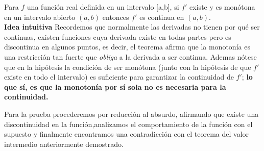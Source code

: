 \begin{teorema}
    Para \(f\) una función real definida en un intervalo [a,b], si $f'$ existe y es monótona en un intervalo abierto $(a, b)$ entonces $f'$ es continua en $(a, b)$.\\
    
    \textbf{Idea intuitiva}  \normalsize
Recordemos que normalmente las derivadas no tienen por qué ser continuas, existen funciones cuya derivada existe en todas partes pero es discontinua en algunos puntos, es decir, el teorema afirma que la monotonía es una restricción tan fuerte que \textit{obliga} a la derivada a ser continua. Ademas nótese que en la hipótesis la condición de ser monótona (junto con la hipótesis de que \(f'\) existe en todo el intervalo) es suficiente para garantizar la continuidad de \(f'\); \textbf{lo que sí, es que la monotonía por sí sola no es necesaria  para la continuidad.}

Para la prueba procederemos por reducción al absurdo, afirmando que existe una discontinuidad en la función,analizamos el comportamiento de la función con el supuesto y finalmente encontramos una contradicción con el teorema del valor intermedio anteriormente demostrado.
\end{teorema}
